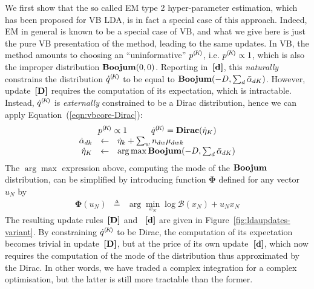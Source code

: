 We first show that the so called EM type 2 hyper-parameter estimation, which has been proposed for VB LDA, is in fact a special case of this approach. Indeed, EM in general is known to be a special case of VB, and what we give here is just the pure VB presentation of the method, leading to the same updates. In VB, the method amounts to choosing an ``uninformative'' ${p}^{(\!{K}\!)}$, i.e. ${p}^{(\!{K}\!)}\propto1$, which is also the improper distribution $\mathbf{Boojum}(0,0)$. Reporting in~$\textbf{[d]}$, this {\em naturally} constrains the distribution ${\dot{q}}^{(\!{K}\!)}$ to be equal to $\mathbf{Boojum}(-D,\sum_d\bar{\alpha}_{dK})$. However, update~$\textbf{[D]}$ requires the computation of its expectation, which is intractable. Instead, ${\dot{q}}^{(\!{K}\!)}$ is {\em externally} constrained to be a Dirac distribution, hence we can apply Equation~(\ref{eqn:vbcore-Dirac}):
\[
\begin{array}{rcl}
\multicolumn{3}{c}{
\begin{array}{c@{\hspace{1cm}}c}
\cpnt{p}{K}\propto1 &
\cpnt{\dot{q}}{K} = \mathbf{Dirac}(\vvmK_K)
\end{array}
}\\
\vvmDK_{dk} & \assignn & \vvmK_k+\sum_wn_{dw}\vvmDWK_{dwk} \\
\vvmK_K & \assignn & \arg\max\mbeta(-D,\sum_d\vvmbDK_{dK})
\end{array}
\]
The $\arg\max$ expression above, computing the mode of the $\mathbf{Boojum}$ distribution, can be simplified by introducing function $\boldsymbol{\Phi}$ defined for any vector $u_N$ by
\begin{eqnarray*}
\boldsymbol{\Phi}(u_N) & \triangleq & \arg\min_{x_N}\log\mathcal{B}(x_N)+u_Nx_N
\end{eqnarray*}
The resulting update rules~$\textbf{[D]}$ and ~$\textbf{[d]}$ are given in Figure~\ref{fig:ldaupdates-variant}. By constraining ${\dot{q}}^{(\!{K}\!)}$ to be Dirac, the computation of its expectation becomes trivial in update~$\textbf{[D]}$, but at the price of its own update~$\textbf{[d]}$, which now requires the computation of the mode of the distribution thus approximated by the Dirac. In other words, we have traded a complex integration for a complex optimisation, but the latter is still more tractable than the former.

